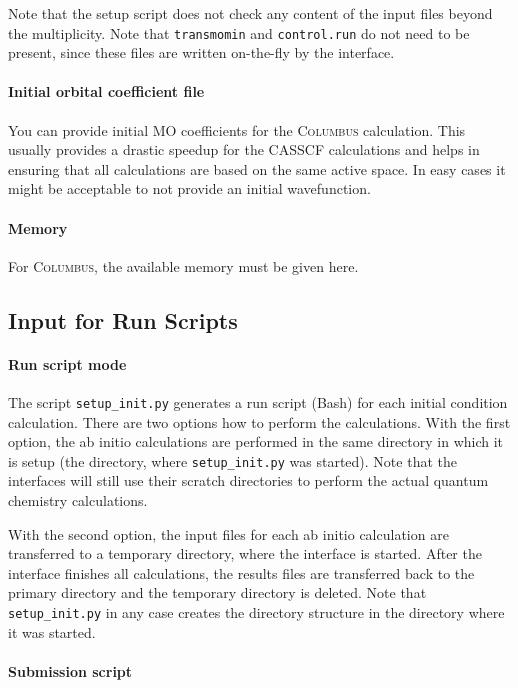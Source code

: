 \documentclass[a4paper,11pt,DIV=15,openany,twoside=false]{scrbook}
\newcommand{\ttt}[1]{\texttt{#1}}
\begin{document}
Note that the setup script does not check any content of the input files beyond the multiplicity. Note that \ttt{transmomin} and \ttt{control.run} do not need to be present, since these files are written on-the-fly by the interface. 

\paragraph{Initial orbital coefficient file}

You can provide initial MO coefficients for the \textsc{Columbus} calculation. This usually provides a drastic speedup for the CASSCF calculations and helps in ensuring that all calculations are based on the same active space. In easy cases it might be acceptable to not provide an initial wavefunction.

\paragraph{Memory}

For \textsc{Columbus}, the available memory must be given here. 

\subsection{Input for Run Scripts}

\paragraph{Run script mode}

The script \ttt{setup\_init.py} generates a run script (Bash) for each initial condition calculation. There are two options how to perform the calculations. With the first option, the ab initio calculations are performed in the same directory in which it is setup (the directory, where \ttt{setup\_init.py} was started). Note that the interfaces will still use their scratch directories to perform the actual quantum chemistry calculations.

With the second option, the input files for each ab initio calculation are transferred to a temporary directory, where the interface is started. After the interface finishes all calculations, the results files are transferred back to the primary directory and the temporary directory is deleted. Note that \ttt{setup\_init.py} in any case creates the directory structure in the directory where it was started.

\paragraph{Submission script}
\end{document}
